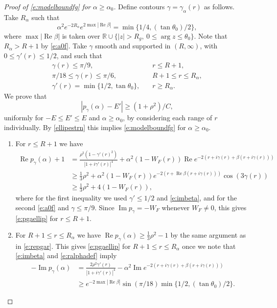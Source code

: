 \documentclass[reqno, 12pt]{amsart}
\newcommand \R {\mathbb{R}}
\DeclareMathOperator \re {Re}
\DeclareMathOperator \im {Im}
\theoremstyle{definition}
\numberwithin{equation}{section}
\numberwithin{prop}{section}
\numberwithin{figure}{section}
\begin{document}
\begin{proof}[Proof of \eqref{e:modelboundfg} for $\alpha \ge \alpha_0$]  Define contours $\gamma = \gamma_\alpha(r)$ as follows. Take $R_\alpha$ such that  
\begin{equation}\label{e:ralphadef}
\alpha^2 e^{-2R_\alpha} e^{2 \max |\re \beta|} = \min\{1/4,(\tan \theta_0)/2\},
\end{equation}
where $\max |\re \beta|$ is taken over $\R \cup \{|z| >R_g, \ 0 \le \arg z \le \theta_0\}$.
Note that  $R_\alpha > R+1$ by \eqref{e:a0f}. Take $\gamma$  smooth and supported in $(R,\infty)$, with $0 \le \gamma'(r) \le 1/2$, and such that
\[\begin{split}
\gamma(r) \le \pi/9, \quad &r \le R+1,\\
\pi/18 \le \gamma(r) \le \pi/6, \quad &R+1 \le r \le R_\alpha,\\
\gamma'(r) = \min\{1/2,\tan \theta_0\}, \quad & r \ge R_\alpha.
\end{split}\]
We prove that
\begin{equation}\label{e:pgaellip}
|p_\gamma(\alpha) - E'| \ge (1+\rho^2)/C,
\end{equation}
uniformly for $-E \le E' \le E$ and $\alpha \ge \alpha_0$, by considering each range of $r$ individually. By \eqref{ellipestrn} this implies \eqref{e:modelboundfg} for $\alpha \ge \alpha_0$.

\begin{enumerate}
\item For $r \le R+1$ we have
\begin{equation}\label{e:repgar}\begin{split}
\re p_\gamma(\alpha) + 1 &= \frac{\rho^2(1-\gamma'(r)^2)}{|1 + i\gamma'(r)|^4} + \alpha^2(1-W_F(r))\re e^{-2(r + i \gamma(r) + \beta(r + i \gamma(r)))}  \\
&\ge\frac 13 \rho^2 +  \alpha^2(1-W_F(r))e^{-2(r+\re \beta(r+i\gamma(r)))} \cos (3\gamma(r)) \\
&\ge \frac 13 \rho^2 + 4(1-W_F(r)) ,
\end{split}\end{equation}
where for the first inequality we used $\gamma'\le 1/2$ and \eqref{e:imbeta}, and for the second \eqref{e:a0f} and $\gamma \le \pi/9$.
Since $\im p_\gamma = -W_F$ whenever $W_F \ne 0$, this gives \eqref{e:pgaellip} for $r \le R+1$.


\item For $R+1 \le r \le R_\alpha$ we have $\re p_\gamma(\alpha) \ge \frac 13 \rho^2 - 1$ by the same argument as in \eqref{e:repgar}. This gives \eqref{e:pgaellip} for $R+1 \le r \le R_\alpha$ once we note that \eqref{e:imbeta} and \eqref{e:ralphadef} imply
\[\begin{split}
-\im p_\gamma(\alpha) &=  \frac{2\rho^2\gamma'(r)}{|1 + i\gamma'(r)|^4} - \alpha^2\im e^{-2(r + i \gamma(r) + \beta(r + i \gamma(r)))} \\&\ge e^{-2\max|\re\beta|}\sin(\pi/18)\min\{1/2,(\tan \theta_0)/2\}.
\end{split}\]


\end{enumerate}
\end{proof}
\end{document}
